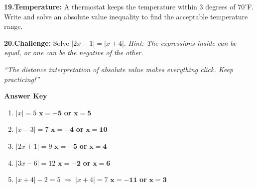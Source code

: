 \documentclass[11pt]{article}
\newcommand{\wsp}{\vspace{2.4cm}}
\newcommand{\wspm}{\vspace{1.8cm}}
\begin{document}
\vspace{10pt}

\noindent\textbf{19.}\quad \textbf{Temperature:} A thermostat keeps the temperature within
3 degrees of $70^\circ$F. Write and solve an absolute value inequality to find the
acceptable temperature range.

\wspm

\noindent\underline{\hspace{\linewidth}}

\vspace{10pt}

\noindent\textbf{20.}\quad \textbf{Challenge:} Solve $|2x-1|=|x+4|$.
\textit{Hint: The expressions inside can be equal, or one can be the negative of the other.}

\wsp

\noindent\underline{\hspace{\linewidth}}

\vspace{10pt}

\begin{center}
\textit{``The distance interpretation of absolute value makes everything click.
Keep practicing!''}
\end{center}


\newpage

\begin{center}
{\LARGE\bfseries Answer Key}
\end{center}
\vspace{6pt}


\begin{tcolorbox}[anskey, title={Section A \textemdash\ Absolute Value Equations}]
\begin{enumerate}[leftmargin=1.8em, itemsep=4pt]
  \item $|x|=5$ \hfill $\boldsymbol{x=-5}$ \textbf{ or } $\boldsymbol{x=5}$
  \item $|x-3|=7$ \hfill $\boldsymbol{x=-4}$ \textbf{ or } $\boldsymbol{x=10}$
  \item $|2x+1|=9$ \hfill $\boldsymbol{x=-5}$ \textbf{ or } $\boldsymbol{x=4}$
  \item $|3x-6|=12$ \hfill $\boldsymbol{x=-2}$ \textbf{ or } $\boldsymbol{x=6}$
  \item $|x+4|-2=5 \;\Rightarrow\; |x+4|=7$ \hfill $\boldsymbol{x=-11}$ \textbf{ or } $\boldsymbol{x=3}$
\end{enumerate}
\end{tcolorbox}
\end{document}

